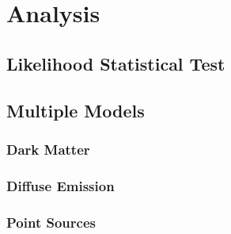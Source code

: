 \cleartooddpage[\thispagestyle{empty}]
\chapter{Analysis}

\section{Likelihood Statistical Test}

\section{Multiple Models}

\subsection{Dark Matter}
\subsection{Diffuse Emission}
\subsection{Point Sources}



